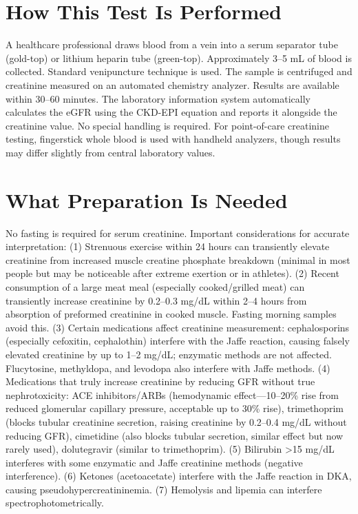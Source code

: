 \section*{How This Test Is Performed}
A healthcare professional draws blood from a vein into a serum separator tube (gold-top) or lithium heparin tube (green-top). Approximately 3--5 mL of blood is collected. Standard venipuncture technique is used. The sample is centrifuged and creatinine measured on an automated chemistry analyzer. Results are available within 30--60 minutes. The laboratory information system automatically calculates the eGFR using the CKD-EPI equation and reports it alongside the creatinine value. No special handling is required. For point-of-care creatinine testing, fingerstick whole blood is used with handheld analyzers, though results may differ slightly from central laboratory values.

\section*{What Preparation Is Needed}
No fasting is required for serum creatinine. Important considerations for accurate interpretation: (1) Strenuous exercise within 24 hours can transiently elevate creatinine from increased muscle creatine phosphate breakdown (minimal in most people but may be noticeable after extreme exertion or in athletes). (2) Recent consumption of a large meat meal (especially cooked/grilled meat) can transiently increase creatinine by 0.2--0.3 mg/dL within 2--4 hours from absorption of preformed creatinine in cooked muscle. Fasting morning samples avoid this. (3) Certain medications affect creatinine measurement: cephalosporins (especially cefoxitin, cephalothin) interfere with the Jaffe reaction, causing falsely elevated creatinine by up to 1--2 mg/dL; enzymatic methods are not affected. Flucytosine, methyldopa, and levodopa also interfere with Jaffe methods. (4) Medications that truly increase creatinine by reducing GFR without true nephrotoxicity: ACE inhibitors/ARBs (hemodynamic effect---10--20\% rise from reduced glomerular capillary pressure, acceptable up to 30\% rise), trimethoprim (blocks tubular creatinine secretion, raising creatinine by 0.2--0.4 mg/dL without reducing GFR), cimetidine (also blocks tubular secretion, similar effect but now rarely used), dolutegravir (similar to trimethoprim). (5) Bilirubin >15 mg/dL interferes with some enzymatic and Jaffe creatinine methods (negative interference). (6) Ketones (acetoacetate) interfere with the Jaffe reaction in DKA, causing pseudohypercreatininemia. (7) Hemolysis and lipemia can interfere spectrophotometrically.

